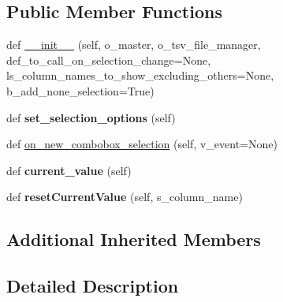 \subsection*{Public Member Functions}
\begin{DoxyCompactItemize}
\item 
def \hyperlink{classnegui_1_1pgneestimationtableselectioncombo_1_1PGNeEstTableColumnSelectionCombo_afefe82d63da27c9ea4837a6353b023bd}{\+\_\+\+\_\+init\+\_\+\+\_\+} (self, o\+\_\+master, o\+\_\+tsv\+\_\+file\+\_\+manager, def\+\_\+to\+\_\+call\+\_\+on\+\_\+selection\+\_\+change=None, ls\+\_\+column\+\_\+names\+\_\+to\+\_\+show\+\_\+excluding\+\_\+others=None, b\+\_\+add\+\_\+none\+\_\+selection=True)
\item 
def {\bfseries set\+\_\+selection\+\_\+options} (self)\hypertarget{classnegui_1_1pgneestimationtableselectioncombo_1_1PGNeEstTableColumnSelectionCombo_a450dad62c4d1ab479ab9388f8d11de0a}{}\label{classnegui_1_1pgneestimationtableselectioncombo_1_1PGNeEstTableColumnSelectionCombo_a450dad62c4d1ab479ab9388f8d11de0a}

\item 
def \hyperlink{classnegui_1_1pgneestimationtableselectioncombo_1_1PGNeEstTableColumnSelectionCombo_a595df4d9b866e930a31b4b6f9caddba6}{on\+\_\+new\+\_\+combobox\+\_\+selection} (self, v\+\_\+event=None)
\item 
def {\bfseries current\+\_\+value} (self)\hypertarget{classnegui_1_1pgneestimationtableselectioncombo_1_1PGNeEstTableColumnSelectionCombo_a56687642d4923549ce826da179ab4453}{}\label{classnegui_1_1pgneestimationtableselectioncombo_1_1PGNeEstTableColumnSelectionCombo_a56687642d4923549ce826da179ab4453}

\item 
def {\bfseries reset\+Current\+Value} (self, s\+\_\+column\+\_\+name)\hypertarget{classnegui_1_1pgneestimationtableselectioncombo_1_1PGNeEstTableColumnSelectionCombo_adb1862fb46f1082809424c386a14fab2}{}\label{classnegui_1_1pgneestimationtableselectioncombo_1_1PGNeEstTableColumnSelectionCombo_adb1862fb46f1082809424c386a14fab2}

\end{DoxyCompactItemize}
\subsection*{Additional Inherited Members}


\subsection{Detailed Description}


